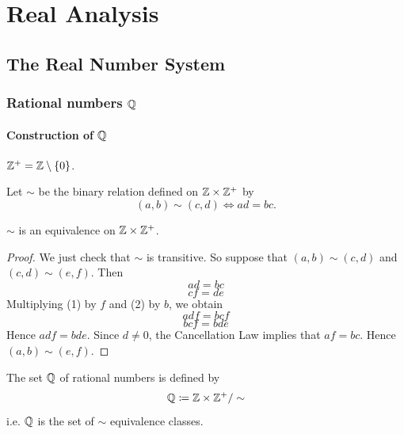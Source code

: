 \part{Real Analysis}
\chapter{The Real Number System}
\section{Rational numbers $\mathbb Q$}
\subsection{Construction of $\mathbb Q$}
\begin{notation}
$\mathbb Z^+=\mathbb Z\setminus\{0\}$.
\end{notation}

\begin{definition}
Let $\sim$ be the binary relation defined on $\mathbb Z\times\mathbb Z^+$ by
\[ (a,b)\sim(c,d) \iff ad=bc. \]
\end{definition}

\begin{theorem}
$\sim$ is an equivalence on $\mathbb Z\times\mathbb Z^+$.
\end{theorem}

\begin{proof}
We just check that $\sim$ is transitive. So suppose that $(a,b)\sim(c,d)$ and $(c,d)\sim(e,f)$. Then
\begin{equation*}\tag{1}
ad=bc
\end{equation*}
\begin{equation*}\tag{2}
cf=de
\end{equation*}
Multiplying (1) by $f$ and (2) by $b$, we obtain
\begin{equation*}\tag{3}
adf=bcf
\end{equation*}
\begin{equation*}\tag{4}
bcf=bde
\end{equation*}
Hence $adf=bde$. Since $d\neq0$, the Cancellation Law implies that $af=bc$. Hence $(a,b)\sim(e,f)$.
\end{proof}

\begin{definition}
The set $\mathbb Q$ of rational numbers is defined by
\[ \mathbb Q\coloneqq\mathbb Z\times\mathbb Z^+/\sim \]
i.e. $\mathbb Q$ is the set of $\sim$ equivalence classes.
\end{definition}



